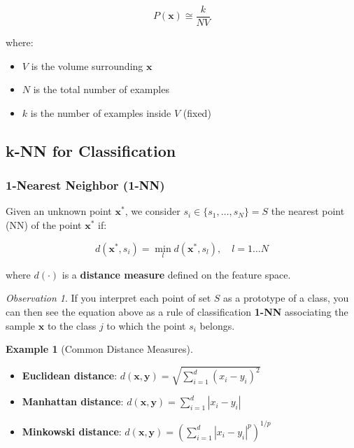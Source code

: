 \documentclass[11pt,a4paper]{article}
\theoremstyle{definition}
\newtheorem{example}{Example}[section]
\theoremstyle{plain}
\theoremstyle{remark}
\newtheorem*{observation}{Observation}
\begin{document}
\begin{tcolorbox}[colback=green!5!white,colframe=green!75!black,title=\textbf{k-NN Density Estimation}]
\[
P(\mathbf{x}) \cong \frac{k}{NV}
\]

where:
\begin{itemize}
    \item $V$ is the volume surrounding $\mathbf{x}$
    \item $N$ is the total number of examples
    \item $k$ is the number of examples inside $V$ (fixed)
\end{itemize}
\end{tcolorbox}

\subsection{k-NN for Classification}

\subsubsection{1-Nearest Neighbor (1-NN)}

Given an unknown point $\mathbf{x}^*$, we consider $s_i \in \{s_1, \ldots, s_N\} = S$ the nearest point (NN) of the point $\mathbf{x}^*$ if:

\[
d(\mathbf{x}^*, s_i) = \min_l d(\mathbf{x}^*, s_l), \quad l = 1 \ldots N
\]

where $d(\cdot)$ is a \textbf{distance measure} defined on the feature space.

\begin{observation}
If you interpret each point of set $S$ as a prototype of a class, you can then see the equation above as a rule of classification \textbf{1-NN} associating the sample $\mathbf{x}$ to the class $j$ to which the point $s_i$ belongs.
\end{observation}

\begin{example}[Common Distance Measures]

    
\begin{itemize}
    \item \textbf{Euclidean distance}: $d(\mathbf{x}, \mathbf{y}) = \sqrt{\sum_{i=1}^{d} (x_i - y_i)^2}$
    
    \item \textbf{Manhattan distance}: $d(\mathbf{x}, \mathbf{y}) = \sum_{i=1}^{d} |x_i - y_i|$
    
    \item \textbf{Minkowski distance}: $d(\mathbf{x}, \mathbf{y}) = \left(\sum_{i=1}^{d} |x_i - y_i|^p\right)^{1/p}$
\end{itemize}
\end{example}
\end{document}
